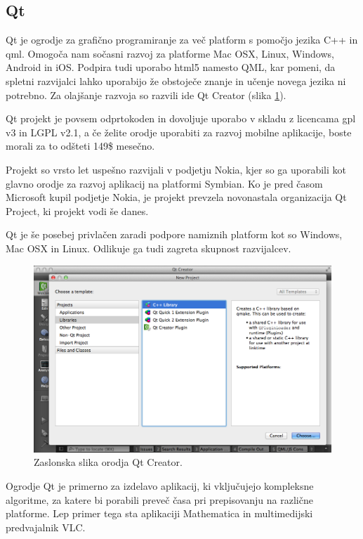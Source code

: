 \subsection{Qt}

Qt\cite{qt} je ogrodje za grafično programiranje za več platform s pomočjo jezika C++ in \gls{qml}. Omogoča nam sočasni razvoj za platforme Mac OSX, Linux, Windows, Android in iOS. Podpira tudi uporabo \gls{html5} namesto QML, kar pomeni, da spletni razvijalci lahko uporabijo že obstoječe znanje in učenje novega jezika ni potrebno. Za olajšanje razvoja so razvili \gls{ide} Qt Creator (slika \ref{fig:qt-creator}).

Qt projekt je povsem odprtokoden in dovoljuje uporabo v skladu z licencama \gls{gpl} v3\cite{gpl} in LGPL v2.1\cite{lgpl}, a če želite orodje uporabiti za razvoj mobilne aplikacije, boste morali za to odšteti 149\$ mesečno.

Projekt so vrsto let uspešno razvijali v podjetju Nokia, kjer so ga uporabili kot glavno orodje za razvoj aplikacij na platformi Symbian. Ko je pred časom Microsoft kupil podjetje Nokia, je projekt prevzela novonastala organizacija Qt Project, ki projekt vodi še danes.

Qt je še posebej privlačen zaradi podpore namiznih platform kot so Windows, Mac OSX in Linux. Odlikuje ga tudi zagreta skupnost razvijalcev.

\begin{figure}
 \includegraphics[width=\linewidth]{qt-creator}
 \caption{Zaslonska slika orodja Qt Creator.}
 \label{fig:qt-creator}
\end{figure}

Ogrodje Qt je primerno za izdelavo aplikacij, ki vključujejo kompleksne algoritme, za katere bi porabili preveč časa pri prepisovanju na različne platforme. Lep primer tega sta aplikaciji Mathematica\cite{mathematica} in multimedijski predvajalnik VLC\cite{vlc}.

